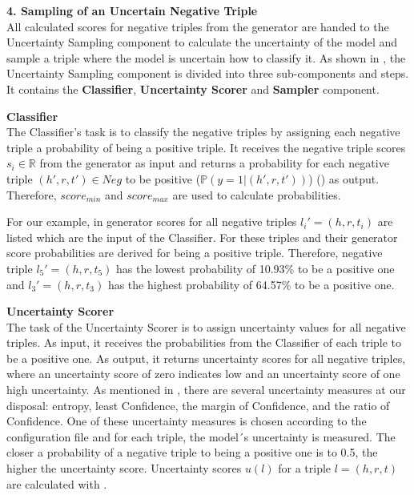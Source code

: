 \textbf{4. Sampling of an Uncertain Negative Triple}\\
%
All calculated scores for negative triples from the generator are handed to the Uncertainty Sampling component to calculate the uncertainty of the model and sample a triple where the model is uncertain how to classify it.
As shown in , the Uncertainty Sampling component is divided into three sub-components and steps.
It contains the \textbf{Classifier}, \textbf{Uncertainty Scorer} and \textbf{Sampler} component.


\textbf{Classifier} \\
The Classifier's task is to classify the negative triples by assigning each negative triple a probability of being a positive triple.
It receives the negative triple scores $s_i \in \mathbb{R}$ from the generator as input and returns a probability for each negative triple $(h',r,t') \in Neg$ to be positive  ($\mathbb{P}(y = 1| (h',r,t'))$) () as output. 
Therefore, $score_{min}$ and $score_{max}$ are used to calculate probabilities.

For our example, in  generator scores for all negative triples $l_i' = (h, r, t_i)$ are listed which are the input of the Classifier.
For these triples and their generator score probabilities are derived for being a positive triple.
Therefore, negative triple $l_5' = (h,r,t_5)$ has the lowest probability of 10.93\% to be a positive one and $l_3' = (h,r,t_3)$ has the highest probability of 64.57\% to be a positive one.

\clearpage

\textbf{Uncertainty Scorer} \\
The task of the Uncertainty Scorer is to assign uncertainty values for all negative triples.
As input, it receives the probabilities from the Classifier of each triple to be a positive one.
As output, it returns uncertainty scores for all negative triples, where an uncertainty score of zero indicates low and an uncertainty score of one high uncertainty.
As mentioned in , there are several uncertainty measures at our disposal:
entropy, least Confidence, the margin of Confidence, and the ratio of Confidence.
One of these uncertainty measures is chosen according to the configuration file and for each triple, the model´s uncertainty is measured.
The closer a probability of a negative triple to being a positive one is to 0.5, the higher the uncertainty score. 
Uncertainty scores $u(l)$ for a triple $l = (h,r,t)$ are calculated with .

